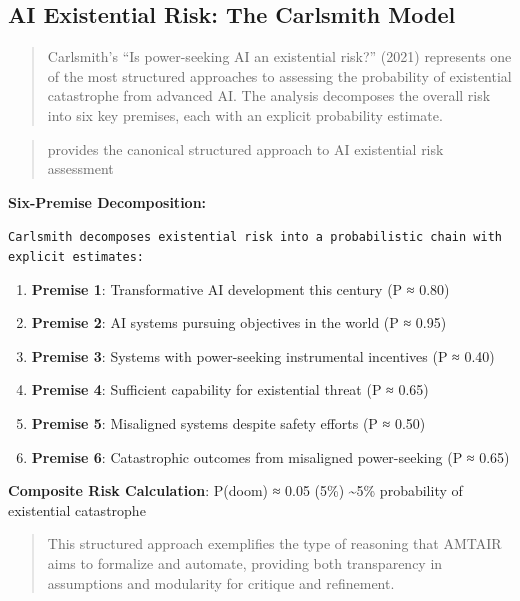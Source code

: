 \documentclass[
  11pt,
  letterpaper,
]{book}
\providecommand{\tightlist}{%
  \setlength{\itemsep}{0pt}\setlength{\parskip}{0pt}}
\begin{document}
\subsection{AI Existential Risk: The Carlsmith
Model}\label{sec-carlsmith-model}

\begin{quote}
Carlsmith's ``Is power-seeking AI an existential risk?'' (2021)
represents one of the most structured approaches to assessing the
probability of existential catastrophe from advanced AI. The analysis
decomposes the overall risk into six key premises, each with an explicit
probability estimate.
\end{quote}

\begin{quote}
\textcite{carlsmith2021} provides the canonical structured approach to
AI existential risk assessment
\end{quote}

\textbf{Six-Premise Decomposition:}

\texttt{Carlsmith\ decomposes\ existential\ risk\ into\ a\ probabilistic\ chain\ with\ explicit\ estimates:}

\begin{enumerate}
\def\labelenumi{\arabic{enumi}.}
\tightlist
\item
  \textbf{Premise 1}: Transformative AI development this century (P ≈
  0.80)
\item
  \textbf{Premise 2}: AI systems pursuing objectives in the world (P ≈
  0.95)
\item
  \textbf{Premise 3}: Systems with power-seeking instrumental incentives
  (P ≈ 0.40)
\item
  \textbf{Premise 4}: Sufficient capability for existential threat (P ≈
  0.65)
\item
  \textbf{Premise 5}: Misaligned systems despite safety efforts (P ≈
  0.50)
\item
  \textbf{Premise 6}: Catastrophic outcomes from misaligned
  power-seeking (P ≈ 0.65)
\end{enumerate}

\textbf{Composite Risk Calculation}: P(doom) ≈ 0.05 (5\%)
\textasciitilde5\% probability of existential catastrophe

\begin{quote}
This structured approach exemplifies the type of reasoning that AMTAIR
aims to formalize and automate, providing both transparency in
assumptions and modularity for critique and refinement.
\end{quote}
\end{document}

